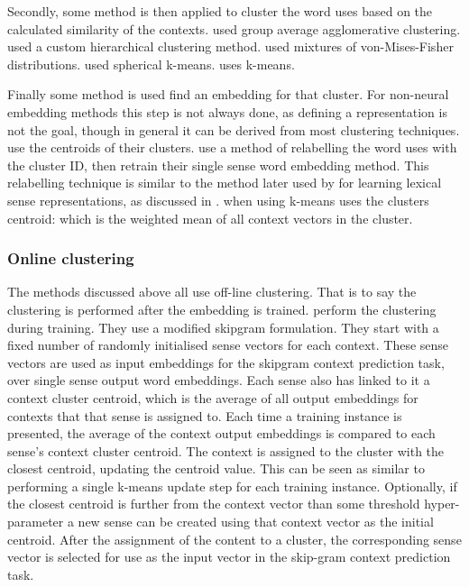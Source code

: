 \documentclass[12pt,parskip]{komatufte}
\begin{document}
Secondly, some method is then applied to cluster the word uses based on the calculated similarity of the contexts.
\textcite{Schutze:1998wordsenseclustering} used group average agglomerative clustering.
\textcite{pantel2002WSI} used a custom hierarchical clustering method.
\textcite{Reisinger2010} used mixtures of von-Mises-Fisher distributions.
\textcite{Huang2012} used spherical k-means.
\textcite{kaageback2015neural} uses k-means.

Finally some method is used find an embedding for that cluster.
For non-neural embedding methods this step is not always done, as defining a representation is not the goal, though in general it can be derived from most clustering techniques.
\textcite{Schutze:1998wordsenseclustering} use the centroids of their clusters.
\textcite{Huang2012} use a method of relabelling the word uses with the cluster ID,
then retrain their single sense word embedding method.
This relabelling technique is similar to the method later used by \textcite{Chen2014} for learning lexical sense representations, as discussed in .
\textcite{kaageback2015neural} when using k-means uses the clusters centroid: which is the weighted mean of all context vectors in the cluster.



\subsubsection{Online clustering}
The methods discussed above all use off-line clustering.
That is to say the clustering is performed after the embedding is trained.
 perform the clustering during training.
They use a modified skipgram formulation.
They start with a fixed number of randomly initialised sense vectors for each context.
These sense vectors are used as input embeddings for the skipgram context prediction task, over single sense output word embeddings.
Each sense also has linked to it a context cluster centroid, which is the average of all output embeddings for contexts that that sense is assigned to.
Each time a training instance is presented, the average of the context output embeddings is compared to each sense's context cluster centroid.
The context is assigned to the cluster with the closest centroid, updating the centroid value.
This can be seen as similar to performing a single k-means update step for each training instance.
Optionally, if the closest centroid is further from the context vector than some threshold hyper-parameter a new sense can be created using that context vector as the initial centroid.
After the assignment of the content to a cluster, the corresponding sense vector is selected for use as the input vector in the skip-gram context prediction task.
\end{document}
